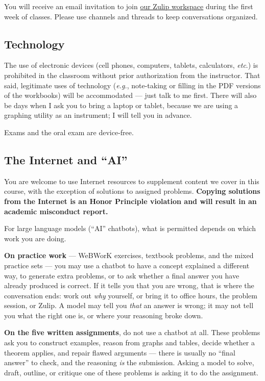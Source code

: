 \documentclass[11pt,twoside]{amsart}
\begin{document}
You will receive an email invitation to join \href{https://math111fall26.zulipchat.com/}{our Zulip workspace} during the first week of classes. Please use channels and threads to keep conversations organized.

\subsection*{Technology}
The use of electronic devices (cell phones, computers, tablets, calculators, \emph{etc}.) is prohibited in the classroom without prior authorization from the instructor.  That said, legitimate uses of technology (\emph{e.g.}, note-taking or filling in the PDF versions of the workbooks) will be accommodated ---
just talk to me first. There will also be days when I ask you to bring a laptop or tablet, because we are using a graphing utility as an instrument; I will tell you in advance.

Exams and the oral exam are device-free.

\subsection*{The Internet and ``AI''}
You are welcome to use Internet resources to supplement content we cover in this
course, with the exception of solutions to assigned problems. \textbf{Copying
solutions from the Internet is an Honor Principle violation and will result in an
academic misconduct report.}

For large language models (``AI'' chatbots), what is permitted depends on which
work you are doing.

\textbf{On practice work} --- WeBWorK exercises, textbook problems, and the mixed
practice sets --- you may use a chatbot to have a concept explained a different
way, to generate extra problems, or to ask whether a final answer you have
already produced is correct. If it tells you that you are wrong, that is where
the conversation ends: work out \emph{why} yourself, or bring it to office hours,
the problem session, or Zulip. A model may tell you \emph{that} an answer is
wrong; it may not tell you what the right one is, or where your reasoning broke
down.

\textbf{On the five written assignments}, do not use a chatbot at all. These
problems ask you to construct examples, reason from graphs and tables, decide
whether a theorem applies, and repair flawed arguments --- there is usually no
``final answer'' to check, and the reasoning \emph{is} the submission. Asking a
model to solve, draft, outline, or critique one of these problems is asking it to
do the assignment.
\end{document}
